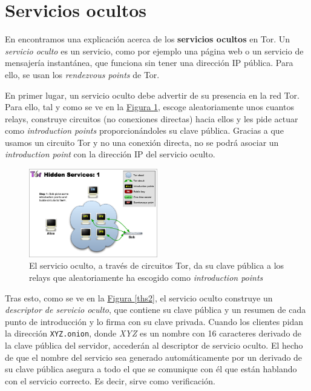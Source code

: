 \documentclass[10pt,a4paper,spanish]{article}
\begin{document}
\section{Servicios ocultos}
En \cite{hiddenservices} encontramos una explicación acerca de los \textbf{servicios ocultos} en Tor. Un \textit{servicio oculto} es un servicio, como por ejemplo una página web o un servicio de mensajería instantánea, que funciona sin tener una dirección IP pública. Para ello, se usan los \textit{rendezvous points} de Tor.

En primer lugar, un servicio oculto debe advertir de su presencia en la red Tor. Para ello, tal y como se ve en la \hyperref[ths1]{Figura \ref*{ths1}}, escoge aleatoriamente unos cuantos relays, construye circuitos (no conexiones directas) hacia ellos y les pide actuar como \textit{introduction points} proporcionándoles su clave pública. Gracias a que usamos un circuito Tor y no una conexión directa, no se podrá asociar un \textit{introduction point} con la dirección IP del servicio oculto.

\begin{figure}[!h]
    \centering
    \includegraphics[width=0.5\textwidth]{THS-1}
    \caption{El servicio oculto, a través de circuitos Tor, da su clave pública a los relays que aleatoriamente ha escogido como \textit{introduction points}}
    \label{ths1}
\end{figure}

Tras esto, como se ve en la \hyperref[ths2]{Figura \ref*{ths2}}, el servicio oculto construye un \textit{descriptor de servicio oculto}, que contiene su clave pública y un resumen de cada punto de introducción y lo firma con su clave privada. Cuando los clientes pidan la dirección \texttt{XYZ.onion}, donde \textit{XYZ} es un nombre con 16 caracteres derivado de la clave pública del servidor, accederán al descriptor de servicio oculto. El hecho de que el nombre del servicio sea generado automáticamente por un derivado de su clave pública asegura a todo el que se comunique con él que están hablando con el servicio correcto. Es decir, sirve como verificación.
\end{document}
